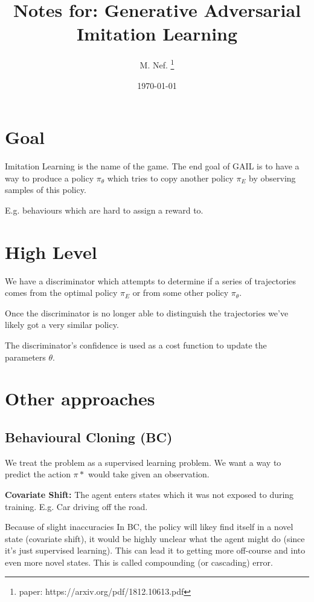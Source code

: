 \documentclass{article}
\title{Notes for: Generative Adversarial Imitation Learning}
\author{M. Nef. \thanks{paper: https://arxiv.org/pdf/1812.10613.pdf}}
\date{\today}
\begin{document}
\maketitle

\section{Goal}

Imitation Learning is the name of the game. The end goal of GAIL is to have a way to produce a policy \(\pi_{\theta}\) which tries to copy another policy \(\pi_{E}\) by observing samples of this policy.

E.g. behaviours which are hard to assign a reward to.

\section{High Level}

We have a discriminator which attempts to determine if a series of trajectories comes from the optimal policy \(\pi_{E}\) or from some other policy \(\pi_{\theta}\).

Once the discriminator is no longer able to distinguish the trajectories we've likely got a very similar policy.

The discriminator's confidence is used as a cost function to update the parameters \(\theta\).

\section{Other approaches}

\subsection{Behavioural Cloning (BC)}

We treat the problem as a supervised learning problem.
We want a way to predict the action \(\pi*\) would take given an observation.

\begin{center}
  \textbf{Covariate Shift:} The agent enters states which it was not exposed to during training. E.g. Car driving off the road.
\end{center}

Because of slight inaccuracies In BC, the policy will likey find itself in a novel state (covariate shift), it would be highly unclear what the agent might do (since it's just supervised learning). This can lead it to getting more off-course and into even more novel states. This is called compounding (or cascading) error.
\end{document}
